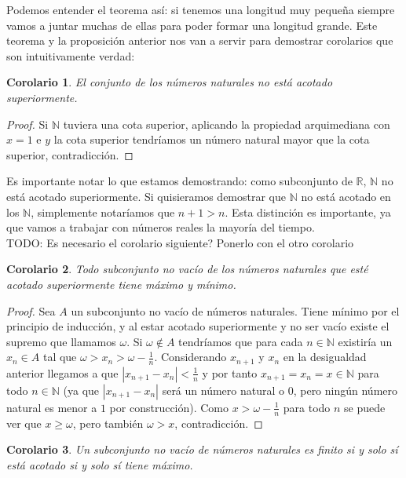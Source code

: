 \documentclass{article}
\newtheorem{cor}{Corolario}
\newcommand{\reales}{\mathbb{R}}
\newcommand{\naturales}{\mathbb{N}}
\begin{document}
Podemos entender el teorema así: si tenemos una longitud muy pequeña siempre vamos a juntar muchas de ellas para poder formar una longitud grande. Este teorema y la proposición anterior nos van a servir para demostrar corolarios que son intuitivamente verdad:
\begin{cor}
	El conjunto de los números naturales no está acotado superiormente.
\end{cor}
\begin{proof}
	Si $\naturales$ tuviera una cota superior, aplicando la propiedad arquimediana con $x=1$ e $y$ la cota superior tendríamos un número natural mayor que la cota superior, contradicción.
\end{proof}
Es importante notar lo que estamos demostrando: como subconjunto de $\reales$, $\naturales$ no está acotado superiormente. Si quisieramos demostrar que $\naturales$ no está acotado en los $\naturales$, simplemente notaríamos que $n+1 > n$. Esta distinción es importante, ya que vamos a trabajar con números reales la mayoría del tiempo.\\ 
TODO: Es necesario el corolario siguiente? Ponerlo con el otro corolario
\begin{cor}
	Todo subconjunto no vacío de los números naturales que esté acotado superiormente tiene máximo y mínimo.
\end{cor}
\begin{proof}
	Sea $A$ un subconjunto no vacío de números naturales. Tiene mínimo por el principio de inducción, y al estar acotado superiormente y no ser vacío existe el supremo que llamamos $\omega$. Si $\omega \not \in A$ tendríamos que para cada $n \in \naturales$ existiría un $x_n \in A$ tal que $\omega > x_n > \omega - \frac{1}{n}$. Considerando $x_{n+1}$ y $x_n$ en la desigualdad anterior llegamos a que $|x_{n+1} - x_n| < \frac{1}{n}$ y por tanto $x_{n+1} = x_n = x \in \naturales$ para todo $n \in \naturales$ (ya que $|x_{n+1} - x_n|$ será un número natural o $0$, pero ningún número natural es menor a $1$ por construcción). Como $x > \omega - \frac{1}{n}$ para todo $n$ se puede ver que $x \geq \omega$, pero también $\omega > x$, contradicción.
\end{proof}
\begin{cor}
	Un subconjunto no vacío de números naturales es finito si y solo sí está acotado si y solo sí tiene máximo.
\end{cor}
\end{document}
